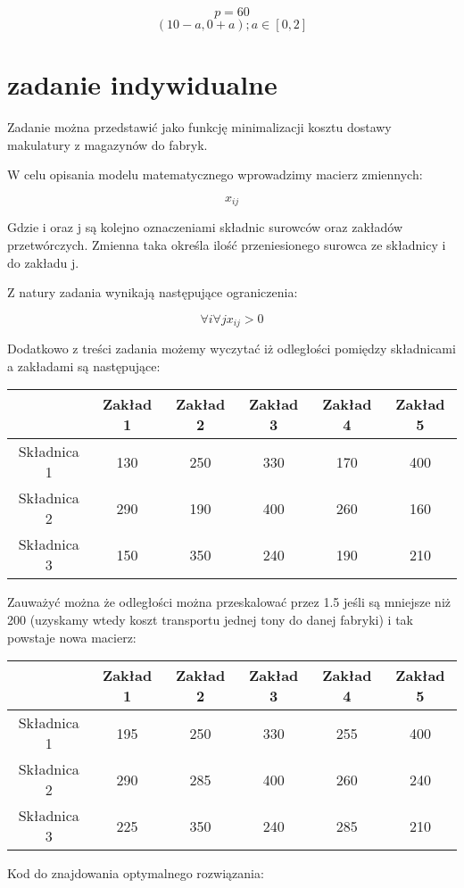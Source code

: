 \documentclass[paper=a4, fontsize=11pt]{scrartcl} %
\numberwithin{equation}{section} %
\numberwithin{figure}{section} %
\numberwithin{table}{section} %
\begin{document}
\[ p = 60 \]
\[ (10 - a, 0 + a); a \in [0, 2] \]

\newpage
\section{zadanie indywidualne}

Zadanie można przedstawić jako funkcję minimalizacji kosztu dostawy makulatury z magazynów do fabryk.

W celu opisania modelu matematycznego wprowadzimy macierz zmiennych:

\[x_{ij}\]

Gdzie i oraz j są kolejno oznaczeniami składnic surowców oraz zakładów przetwórczych.
Zmienna taka określa ilość przeniesionego surowca ze składnicy i do zakładu j.

Z natury zadania wynikają następujące ograniczenia:

\[\forall i\forall j x_{ij} > 0\]

Dodatkowo z treści zadania możemy wyczytać iż odległości pomiędzy składnicami a zakładami są następujące:

{
  \begin{tabular}{|c|c|c|c|c|c|}
    \hline
    & Zakład 1 & Zakład 2 & Zakład 3 & Zakład 4 & Zakład 5 \\ 
    \hline
    Składnica 1 & 130 & 250 & 330 & 170 & 400 \\
    \hline
    Składnica 2 &  290 & 190 & 400 & 260 & 160 \\
    \hline
    Składnica 3 & 150 & 350 & 240 & 190 & 210 \\
    \hline
  \end{tabular}
}

Zauważyć można że odległości można przeskalować przez 1.5 jeśli są mniejsze niż 200 (uzyskamy wtedy koszt transportu jednej tony do danej fabryki) i tak powstaje nowa macierz:

{
  \begin{tabular}{|c|c|c|c|c|c|}
    \hline
    & Zakład 1 & Zakład 2 & Zakład 3 & Zakład 4 & Zakład 5 \\ 
    \hline
    Składnica 1 & 195 & 250 & 330 & 255 & 400 \\
    \hline
    Składnica 2 &  290 & 285 & 400 & 260 & 240 \\
    \hline
    Składnica 3 & 225 & 350 & 240 & 285 & 210 \\
    \hline
  \end{tabular}
}

Kod do znajdowania optymalnego rozwiązania:
\end{document}
